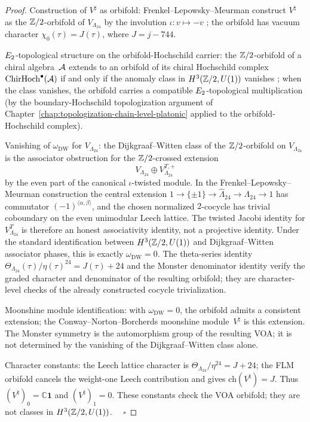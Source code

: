 \begin{proof}
Construction of $V^\natural$ as orbifold: Frenkel--Lepowsky--Meurman
construct $V^\natural$ as the $\mathbb{Z}/2$-orbifold of
$V_{\Lambda_{24}}$ by the involution $\iota: v \mapsto -v$
\cite{Frenkel-Lepowsky-Meurman}; the orbifold has vacuum
character $\chi_0(\tau) = J(\tau)$, where $J=j-744$.

$E_2$-topological structure on the orbifold-Hochschild carrier:
the $\mathbb{Z}/2$-orbifold
of a chiral algebra~$\mathcal{A}$ extends to an orbifold of its chiral
Hochschild complex $\mathrm{ChirHoch}^\bullet(\mathcal{A})$ if and only if
the anomaly class in $H^3(\mathbb{Z}/2, U(1))$ vanishes
\cite{Dijkgraaf-Witten, Kirillov-Orbifold}; when the class vanishes,
the orbifold carries a compatible $E_2$-topological multiplication
\textup{(}by the boundary-Hochschild topologization argument of
Chapter~\ref{chap:topologization-chain-level-platonic}
applied to the orbifold-Hochschild complex\textup{)}.

Vanishing of $\omega_{\mathrm{DW}}$ for $V_{\Lambda_{24}}$: the
Dijkgraaf--Witten class of the $\mathbb{Z}/2$-orbifold on
$V_{\Lambda_{24}}$ is the associator obstruction for the
$\mathbb{Z}/2$-crossed extension
\[
 V_{\Lambda_{24}} \oplus V_{\Lambda_{24}}^{T,+}
\]
by the even part of the canonical $\iota$-twisted module. In the
Frenkel--Lepowsky--Meurman construction the central extension
$1\to\{\pm1\}\to\widehat{\Lambda}_{24}\to\Lambda_{24}\to1$ has
commutator $(-1)^{\langle\alpha,\beta\rangle}$, and the chosen
normalized $2$-cocycle has trivial coboundary on the even unimodular
Leech lattice. The twisted Jacobi identity for
$V_{\Lambda_{24}}^{T}$ is therefore an honest associativity identity,
not a projective identity. Under the standard identification between
$H^3(\mathbb{Z}/2,U(1))$ and Dijkgraaf--Witten associator phases, this is
exactly $\omega_{\mathrm{DW}}=0$. The theta-series identity
$\Theta_{\Lambda_{24}}(\tau)/\eta(\tau)^{24} = J(\tau)+24$
\cite{Conway-Sloane, Borcherds-Monster} and the Monster denominator
identity verify the graded character and denominator of the resulting
orbifold; they are character-level checks of the already constructed
cocycle trivialization.

Moonshine module identification: with $\omega_{\mathrm{DW}} = 0$, the
orbifold admits a consistent extension; the
Conway--Norton--Borcherds moonshine module~$V^\natural$
\cite{Borcherds-Monster} is this extension. The Monster symmetry is
the automorphism group of the resulting VOA; it is not determined by
the vanishing of the Dijkgraaf--Witten class alone.

Character constants: the Leech lattice character is
$\Theta_{\Lambda_{24}}/\eta^{24}=J+24$; the FLM orbifold cancels the
weight-one Leech contribution and gives $\mathrm{ch}(V^\natural)=J$.
Thus $(V^\natural)_0=\mathbb C\mathbf 1$ and
$(V^\natural)_1=0$.  These constants check the VOA orbifold; they are
not classes in $H^3(\mathbb{Z}/2,U(1))$. $\quad\square$
\end{proof}

